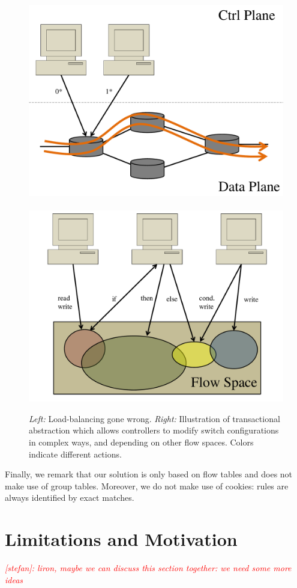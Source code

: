 \documentclass[conference]{sigcomm-alternate}
\newcommand{\stefan}[1]{\textit{\textcolor{red}{[stefan]: #1}}} %
\begin{document}
\begin{figure}[t]
\centering
\includegraphics[width=0.8\columnwidth]{loadbal.pdf}~~
\includegraphics[width=0.8\columnwidth]{pic.pdf}\\
\caption{\emph{Left:} Load-balancing gone wrong. \emph{Right:} Illustration of transactional abstraction which  allows
controllers to modify switch configurations in complex ways,
and
depending on other flow spaces. Colors indicate different actions.}\label{fig:illu}
\end{figure}

Finally, we remark that our solution is only based on flow tables
and does not make use
of group tables. 
Moreover, we do not make use of cookies: rules
are always identified by exact matches.

\section{Limitations and Motivation}\label{sec:motivation}

\stefan{liron, maybe we can discuss this section together: we need some more ideas}
\end{document}
